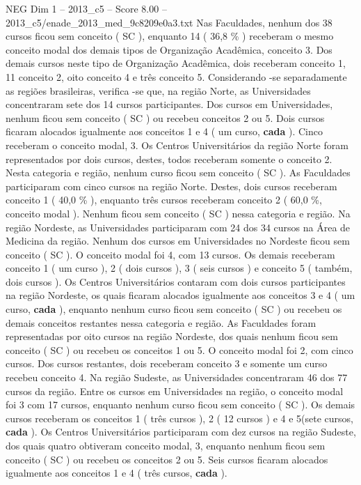\begin{textsample}{NEG Dim 1 – 2013\_c5 – Score 8.00 – 2013\_c5/enade\_2013\_med\_9c8209e0a3.txt}
Nas Faculdades, nenhum dos 38 cursos ficou sem conceito ( SC ), enquanto 14 ( 36,8 \% ) receberam o mesmo conceito modal dos demais tipos de Organização Acadêmica, conceito 3.
Dos demais cursos neste tipo de Organização Acadêmica, dois receberam conceito 1, 11 conceito 2, oito conceito 4 e três conceito 5.
Considerando -se separadamente as regiões brasileiras, verifica -se que, na região Norte, as Universidades concentraram sete dos 14 cursos participantes.
Dos cursos em Universidades, nenhum ficou sem conceito ( SC ) ou recebeu conceitos 2 ou 5.
Dois cursos ficaram alocados igualmente aos conceitos 1 e 4 ( um curso, \textbf{cada} ).
Cinco receberam o conceito modal, 3.
Os Centros Universitários da região Norte foram representados por dois cursos, destes, todos receberam somente o conceito 2.
Nesta categoria e região, nenhum curso ficou sem conceito ( SC ).
As Faculdades participaram com cinco cursos na região Norte.
Destes, dois cursos receberam conceito 1 ( 40,0 \% ), enquanto três cursos receberam conceito 2 ( 60,0 \%, conceito modal ).
Nenhum ficou sem conceito ( SC ) nessa categoria e região.
Na região Nordeste, as Universidades participaram com 24 dos 34 cursos na Área de Medicina da região.
Nenhum dos cursos em Universidades no Nordeste ficou sem conceito ( SC ).
O conceito modal foi 4, com 13 cursos.
Os demais receberam conceito 1 ( um curso ), 2 ( dois cursos ), 3 ( seis cursos ) e conceito 5 ( também, dois cursos ).
Os Centros Universitários contaram com dois cursos participantes na região Nordeste, os quais ficaram alocados igualmente aos conceitos 3 e 4 ( um curso, \textbf{cada} ), enquanto nenhum curso ficou sem conceito ( SC ) ou recebeu os demais conceitos restantes nessa categoria e região.
As Faculdades foram representadas por oito cursos na região Nordeste, dos quais nenhum ficou sem conceito ( SC ) ou recebeu os conceitos 1 ou 5.
O conceito modal foi 2, com cinco cursos.
Dos cursos restantes, dois receberam conceito 3 e somente um curso recebeu conceito 4.
Na região Sudeste, as Universidades concentraram 46 dos 77 cursos da região.
Entre os cursos em Universidades na região, o conceito modal foi 3 com 17 cursos, enquanto nenhum curso ficou sem conceito ( SC ).
Os demais cursos receberam os conceitos 1 ( três cursos ), 2 ( 12 cursos ) e 4 e 5(sete cursos, \textbf{cada} ).
Os Centros Universitários participaram com dez cursos na região Sudeste, dos quais quatro obtiveram conceito modal, 3, enquanto nenhum ficou sem conceito ( SC ) ou recebeu os conceitos 2 ou 5.
Seis cursos ficaram alocados igualmente aos conceitos 1 e 4 ( três cursos, \textbf{cada} ).

\end{textsample}
